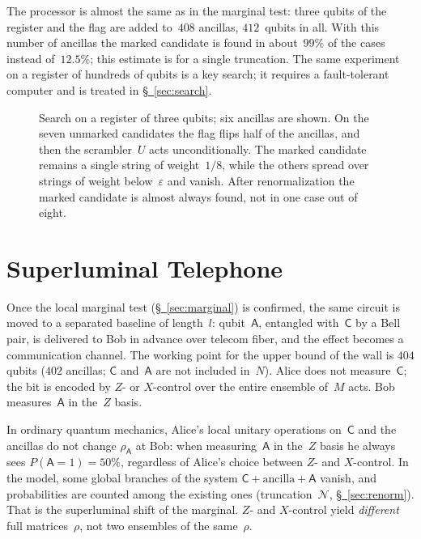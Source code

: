 \documentclass[11pt,a4paper]{article}
\newcommand{\qC}{\mathsf{C}}
\newcommand{\qA}{\mathsf{A}}
\begin{document}
The processor is almost the same as in the marginal test: three qubits of the register and the flag are added to~$408$ ancillas, $412$~qubits in all. With this number of ancillas the marked candidate is found in about~$99\%$ of the cases instead of~$12.5\%$; this estimate is for a single truncation. The same experiment on a register of hundreds of qubits is a key search; it requires a fault-tolerant computer and is treated in \hyperref[sec:search]{\S~\ref*{sec:search}}.

\begin{figure}[ht]
\centering

\caption{Search on a register of three qubits; six ancillas are shown. On the seven unmarked candidates the flag flips half of the ancillas, and then the scrambler~$U$ acts unconditionally. The marked candidate remains a single string of weight~$1/8$, while the others spread over strings of weight below~$\varepsilon$ and vanish. After renormalization the marked candidate is almost always found, not in one case out of eight.}
\label{fig:search}
\end{figure}

\section{Superluminal Telephone}
\label{sec:signaling}

Once the local marginal test (\hyperref[sec:marginal]{\S~\ref*{sec:marginal}}) is confirmed, the same circuit is moved to a separated baseline of length~$l$: qubit~$\qA$, entangled with~$\qC$ by a Bell pair, is delivered to Bob in advance over telecom fiber, and the effect becomes a communication channel. The working point for the upper bound of the wall is $404$ qubits ($402$ ancillas; $\qC$ and~$\qA$ are not included in~$N$). Alice does not measure~$\qC$; the bit is encoded by $Z$- or $X$-control over the entire ensemble of~$M$ acts. Bob measures~$\qA$ in the~$Z$ basis.

In ordinary quantum mechanics, Alice's local unitary operations on~$\qC$ and the ancillas do not change $\rho_{\qA}$ at Bob: when measuring~$\qA$ in the~$Z$ basis he always sees $P(\qA{=}1)=50\%$, regardless of Alice's choice between $Z$- and $X$-control. In the model, some global branches of the system $\qC+\text{ancilla}+\qA$ vanish, and probabilities are counted among the existing ones (truncation~$\mathcal N$, \hyperref[sec:renorm]{\S~\ref*{sec:renorm}}). That is the superluminal shift of the marginal. $Z$- and $X$-control yield \emph{different} full matrices~$\rho$, not two ensembles of the same~$\rho$.
\end{document}
